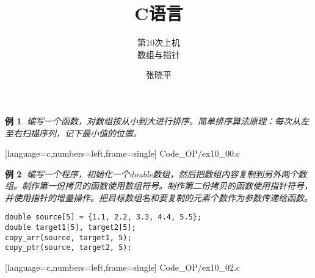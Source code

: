 \documentclass[10pt,notheorems]{beamer}
\newtheorem{li}{例}
\begin{document}
\title{C语言}
\subtitle{第10次上机\\ 数组与指针}
\author{张晓平}


\begin{frame}[plain]\transboxout
\titlepage
\end{frame}




\begin{frame}[fragile]
\begin{li} 
	编写一个函数，对数组按从小到大进行排序。简单排序算法原理：每次从左至右扫描序列，记下最小值的位置。
\end{li}
\end{frame}


\begin{frame}

[language=c,numbers=left,frame=single]
{Code_OP/ex10_00.c}
\end{frame}


\begin{frame}[fragile]
\begin{li} 
编写一个程序，初始化一个double数组，然后把数组内容复制到另外两个数组。制作第一份拷贝的函数使用数组符号。制作第二份拷贝的函数使用指针符号，并使用指针的增量操作。把目标数组名和要复制的元素个数作为参数传递给函数。
\begin{lstlisting}
double source[5] = {1.1, 2.2, 3.3, 4.4, 5.5};
double target1[5], target2[5];
copy_arr(source, target1, 5);
copy_ptr(source, target2, 5);
\end{lstlisting}
\end{li}
\end{frame}

\begin{frame}

[language=c,numbers=left,frame=single]
{Code_OP/ex10_02.c}
\end{frame}
\end{document}

